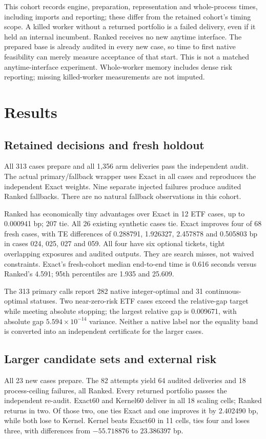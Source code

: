 \documentclass[preprint,12pt,authoryear]{elsarticle}
\begin{document}
This cohort records engine, preparation, representation and whole-process times,
including imports and reporting; these differ from the retained cohort's timing
scope. A killed worker without a returned portfolio is a failed delivery, even
if it held an internal incumbent. Ranked receives no new anytime interface.
The prepared base is already audited in every new case, so time to first native
feasibility can merely measure acceptance of that start. This is not a matched
anytime-interface experiment. Whole-worker memory includes dense risk reporting;
missing killed-worker measurements are not imputed.

\section{Results}\label{sec:results}
\subsection{Retained decisions and fresh holdout}
All 313 cases prepare and all 1,356 arm deliveries pass the independent audit.
The actual primary/fallback wrapper uses Exact in all cases and reproduces the
independent Exact weights. Nine separate injected failures produce audited
Ranked fallbacks. There are no natural fallback observations in this cohort.

\begingroup\let\small\footnotesize

\endgroup

Ranked has economically tiny advantages over Exact in 12 ETF cases, up to
0.000941 bp; 207 tie. All 26 existing synthetic cases tie. Exact improves
four of 68 fresh cases, with TE differences of 0.288791, 1.926327, 2.457878
and 0.505803 bp in cases 024, 025, 027 and 059. All four have six optional
tickets, tight overlapping exposures and audited outputs. They are search
misses, not waived constraints. Exact's fresh-cohort median end-to-end time
is 0.616 seconds versus Ranked's 4.591; 95th percentiles are 1.935 and 25.609.

The 313 primary calls report 282 native integer-optimal and 31 continuous-optimal
statuses. Two near-zero-risk ETF cases exceed the relative-gap target while
meeting absolute stopping; the largest relative gap is 0.009671, with absolute
gap $5.594\times10^{-14}$ variance. Neither a native label nor the equality
band is converted into an independent certificate for the larger cases.

\subsection{Larger candidate sets and external risk}
All 23 new cases prepare. The 82 attempts yield 64 audited deliveries and
18 process-ceiling failures, all Ranked. Every returned portfolio passes the
independent re-audit. Exact60 and Kernel60 deliver in all 18 scaling cells;
Ranked returns in two. Of those two, one ties Exact and one improves it by
2.402490 bp, while both lose to Kernel. Kernel beats Exact60 in 11 cells,
ties four and loses three, with differences from $-55.718876$ to $23.386397$ bp.
\end{document}
